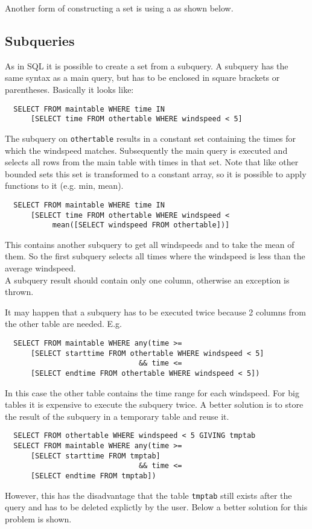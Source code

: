 Another form of constructing a set is using a
 as shown below.

\subsection{\label{TAQL:SUBQUERIES}Subqueries}
As in SQL it is possible to create a set from a subquery. A
subquery has the same syntax as a main query, but has to be
enclosed in square brackets or parentheses. Basically it looks like:
\begin{verbatim}
  SELECT FROM maintable WHERE time IN
      [SELECT time FROM othertable WHERE windspeed < 5]
\end{verbatim}
The subquery on \texttt{othertable} results in a constant set
containing the times
for which the windspeed matches. Subsequently the main query
is executed and selects all rows from the main table with times in
that set.
Note that like other bounded sets this set is transformed to a
constant array, so it is possible to apply functions to it (e.g. min, mean).
\begin{verbatim}
  SELECT FROM maintable WHERE time IN
      [SELECT time FROM othertable WHERE windspeed <
           mean([SELECT windspeed FROM othertable])]
\end{verbatim}
This contains another subquery to get all windspeeds and
to take the mean of them. So the first subquery selects all times
where the windspeed is less than the average windspeed.
\\A subquery result should contain only one column, otherwise
an exception is thrown.

It may happen that a subquery has to be executed twice because
2 columns from the other table are needed. E.g.
\begin{verbatim}
  SELECT FROM maintable WHERE any(time >=
      [SELECT starttime FROM othertable WHERE windspeed < 5]
                               && time <=
      [SELECT endtime FROM othertable WHERE windspeed < 5])
\end{verbatim}
In this case the other table contains the time range for each windspeed.
For big tables it is expensive to execute the subquery twice.
A better solution
is to store the result of the subquery in a temporary table and reuse it.
\begin{verbatim}
  SELECT FROM othertable WHERE windspeed < 5 GIVING tmptab
  SELECT FROM maintable WHERE any(time >=
      [SELECT starttime FROM tmptab]
                               && time <=
      [SELECT endtime FROM tmptab])
\end{verbatim}
However, this has the disadvantage that the table \texttt{tmptab}
still exists after the query and has to be deleted explictly by the
user. Below a better solution for this problem is shown.

